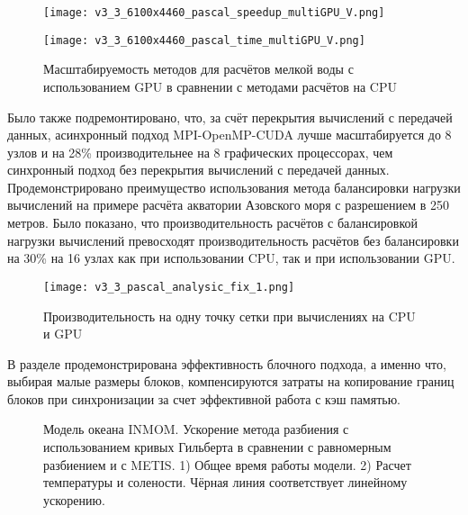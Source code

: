 \begin{figure}[!ht]
	\begin{minipage}{0.5\linewidth}
	\centering
	\texttt{[image: v3\_3\_6100x4460\_pascal\_speedup\_multiGPU\_V.png]}
	\end{minipage}
	\begin{minipage}{0.5\linewidth}
	\centering
    \texttt{[image: v3\_3\_6100x4460\_pascal\_time\_multiGPU\_V.png]}
	\end{minipage}
	\vspace{3pt}
	\caption{Масштабируемость методов для расчётов мелкой воды с использованием GPU в сравнении с методами расчётов на CPU}
	\label{fig:TheBox}
\end{figure}

Было также подремонтировано, что, за счёт перекрытия вычислений с передачей данных, асинхронный подход MPI-OpenMP-CUDA лучше масштабируется до 8 узлов и на 28\% производительнее на 8 графических процессорах, чем синхронный подход без перекрытия вычислений с передачей данных. Продемонстрировано преимущество использования метода балансировки нагрузки вычислений на примере расчёта акватории Азовского моря с разрешением в 250 метров. Было показано, что производительность расчётов с балансировкой нагрузки вычислений превосходят производительность расчётов без балансировки на 30\% на 16 узлах как при использовании CPU, так и при использовании GPU.

\begin{figure}[!ht]
	\begin{minipage}{1\linewidth}
	\centering
	\texttt{[image: v3\_3\_pascal\_analysic\_fix\_1.png]}
	\end{minipage}
	\vspace{3pt}
	\caption{Производительность на одну точку сетки при вычислениях на CPU и GPU}
	\label{fig:TheBox_full}
\end{figure}

В разделе продемонстрирована эффективность блочного подхода, а именно что,
выбирая малые размеры блоков, компенсируются затраты на копирование границ блоков при синхронизации за счет эффективной работа с кэш памя­тью.

	\begin{figure}[htb!]
    \begin{minipage}[h]{0.48\linewidth}
    \end{minipage}
    \hfill
    \begin{minipage}[h]{0.48\linewidth}
    \end{minipage}
    \caption{Модель океана INMOM. Ускорение метода разбиения с использованием кривых Гильберта в сравнении с равномерным разбиением и с METIS. 1) Общее время работы модели. 2) Расчет температуры и солености. 
    Чёрная линия соответствует линейному ускорению.}
    \label{fig:inmom_hilbert1}
    \end{figure}
    

